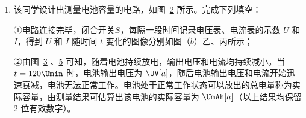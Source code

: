 \begin{enumerate}
\begin{enumerate}
②请根据上述器材设计实验电路，并在答题卡上指定位置补全电路图；
\begin{figure}[htbp]
	\centering
	
\end{figure}


③按照②中正确电路图连接电路，闭合开关 $ S $，记录电流表示数 $ I $ 及电阻箱阻值 $ R_{0} $；断开开关 $ S $，改变 $ R_{0} $。重复以上步骤，得到 $ \frac{1}{I} $ 和 $ R_{0} $ 的关系如图~\ref{2026云南12} 所示，由图可得电池电动势 $ E =$  $\UV[a]$（结果保留 $ 2 $ 位有效数字）。
\begin{figure}[htbp]
	\centering
	
	\caption{}\label{2026云南12}
\end{figure}


\item
该同学设计出测量电池容量的电路，如图~\ref{2026云南13a} 所示。完成下列填空：

①电路连接完毕，闭合开关$ S $，每隔一段时间记录电压表、电流表的示数 $ U $ 和 $ I $，得到 $ U $ 和 $ I $ 随时间 $ t $ 变化的图像分别如图（$ b $）乙、丙所示；
\begin{figure}[htbp]
	\centering
	\begin{subfigure}{0.32\linewidth}
		\centering
		
		\caption{}\label{2026云南13a}
	\end{subfigure}
	\begin{subfigure}{0.33\linewidth}
		\centering
		
		\caption{}\label{2026云南13b}
	\end{subfigure}
	\begin{subfigure}{0.33\linewidth}
		\centering
		
		\caption{}\label{2026云南13c}
	\end{subfigure}
	\caption{}
\end{figure}

②由图~\ref{2026云南13b} 、\ref{2026云南13c} 可知，随着电池持续放电，输出电压和电流均持续减小。当 $ t =120 \Umin $ 时，电池输出电压为  $\UV[a]$，随后电池输出电压和电流开始迅速衰减，电池无法正常工作。电池处于正常工作状态可以放出的总电量称为实际容量，由测量结果可估算出该电池的实际容量为  $\UmAh[a]$（以上结果均保留 $ 2 $ 位有效数字）。	
\end{enumerate}





\end{enumerate}

